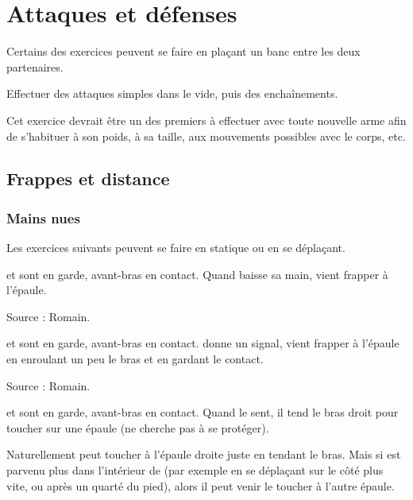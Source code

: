 \chapter{Attaques et défenses}


Certains des exercices peuvent se faire en plaçant un banc entre les deux partenaires.

\begin{exercice}
Effectuer des attaques simples dans le vide, puis des enchaînements.

Cet exercice devrait être un des premiers à effectuer avec toute nouvelle arme afin de s'habituer à son poids, à sa taille, aux mouvements possibles avec le corps, etc.
\end{exercice}



\section{Frappes et distance}


\subsection{Mains nues}


Les exercices suivants peuvent se faire en statique ou en se déplaçant.


\begin{exercice}
\label{struct:ex:contact:frappe-signal}

\A et \D sont en garde, avant-bras en contact.
Quand \A baisse sa main, \D vient frapper à l'épaule.

Source : Romain.

\end{exercice}


\begin{exercice}

\A et \D sont en garde, avant-bras en contact.
\A donne un signal, \D vient frapper à l'épaule en enroulant un peu le bras et en gardant le contact.

Source : Romain.

\end{exercice}


\begin{exercice}
\label{struct:ex:contact:frappe-épaules}

\A et \D sont en garde, avant-bras en contact.
Quand \A le sent, il tend le bras droit pour toucher \D sur une épaule (\D ne cherche pas à se protéger).

Naturellement \A peut toucher \D à l'épaule droite juste en tendant le bras.
Mais si \A est parvenu plus dans l'intérieur de \D (par exemple en se déplaçant sur le côté plus vite, ou après un quarté du pied), alors il peut venir le toucher à l'autre épaule.

\end{exercice}



